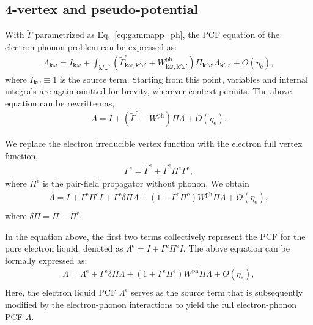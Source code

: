 \documentclass[%
 reprint,
superscriptaddress,
 amsmath,amssymb,
 aps,
prx,
]{revtex4-2}
\newcommand{\bk}{\mathbf{k}}
\newcommand{\Gammapp}{\tilde{\Gamma}}
\newcommand{\txe}{\text{e}}
\newcommand{\txph}{\text{ph}}
\newcommand{\pcf}{\Lambda} %
\begin{document}
\begin{appendices}
\subsection{4-vertex and pseudo-potential}



With $\Gammapp$ parametrized as Eq.~\eqref{eq:gammapp_ph}, the PCF equation of the electron-phonon problem can be expressed as:
\begin{eqnarray}
  \pcf_{\bk^{}\omega^{}} = I_{\bk^{}\omega^{}} + \int_{\bk'\omega'}(\tilde{\Gamma}^\txe_{\bk^{}\omega^{},\bk'\omega'}+W^{\txph}_{\bk^{}\omega^{},\bk'\omega'})\Pi_{\bk'\omega'}\pcf_{\bk'\omega'}+O(\eta_\txe),
  \label{eq:pcf_eph}
\end{eqnarray}
where $I_{\bk\omega}\equiv 1$ is the source term. Starting from this point, variables and internal integrals are again omitted for brevity, wherever context permits. The above equation can be rewritten as,
\begin{eqnarray}
  \pcf = I + (\tilde{\Gamma}^\txe+W^{\txph})\Pi \pcf+O(\eta_\txe).
\end{eqnarray}

We replace the electron irreducible vertex function with the electron full vertex function,
\begin{eqnarray}
  \Gamma^{\txe} = \tilde{\Gamma}^{\txe} + \tilde{\Gamma}^{\txe}\Pi^{\txe}\Gamma^{\txe},
\end{eqnarray}
where $\Pi^{\txe}$ is the pair-field propagator without phonon. We obtain
\begin{eqnarray}
  \label{eq:pcfephfull}
  \pcf = I + \Gamma^{\txe}\Pi^{\txe}I + \Gamma^{\txe}\delta\Pi \pcf  +
  (1+\Gamma^{\txe}\Pi^{\txe})W^{\txph}\Pi \pcf +O(\eta_\txe),\nonumber\\
\end{eqnarray}
where $\delta\Pi=\Pi -\Pi^{\txe}$.

In the equation above, the first two terms collectively represent the PCF for
the pure electron liquid, denoted as $\pcf^{\txe}=I + \Gamma^{\txe}\Pi^{\txe}I$. The above
equation can be formally expressed as: 
\begin{eqnarray}
  \label{eq:pcfephfull2}
  \pcf = \pcf^{\txe} + \Gamma^{\txe}\delta\Pi \pcf  +
  (1+\Gamma^{\txe}\Pi^{\txe})W^{\txph}\Pi \pcf +O(\eta_\txe),\nonumber\\
\end{eqnarray}
Here, the electron liquid PCF $\pcf^{\txe}$ serves as the source term that is
subsequently modified by the electron-phonon interactions to yield the full
electron-phonon PCF $\pcf$.


\end{appendices}
\end{document}
